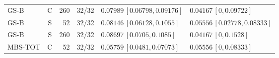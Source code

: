 \begin{longtable}{lcrcp{44mm}p{44mm}}
GS-B & C & 260 & 32/32 & \(0.07989\,[0.06798,0.09176]\) & \(0.04167\,[0,0.09722]\)\\
GS-B & S & 52 & 32/32 & \(0.08146\,[0.06128,0.1055]\) & \(0.05556\,[0.02778,0.08333]\)\\
GS-B & S & 260 & 32/32 & \(0.08697\,[0.0705,0.1085]\) & \(0.04167\,[0,0.1528]\)\\
MBS-TOT & C & 52 & 32/32 & \(0.05759\,[0.0481,0.07073]\) & \(0.05556\,[0,0.08333]\)\\

\end{longtable}

